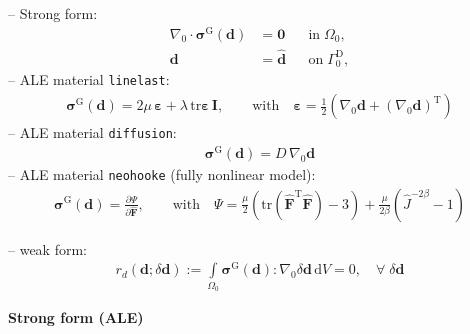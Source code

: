 \documentclass[a4paper,12pt]{report}
\newcommand{\Om}{\mathit{\Omega}}
\newcommand{\Gm}{\mathit{\Gamma}}
\begin{document}
-- Strong form:
\begin{equation}
\label{equation-ale-strong-form}
\begin{aligned}
\nabla_{0} \cdot \boldsymbol{\sigma}^{\mathrm{G}}(\boldsymbol{d}) &= \boldsymbol{0} &&\text{in} \; \mathit{\Om}_0, \\
\boldsymbol{d} &= \hat{\boldsymbol{d}} &&\text{on} \; \mathit{\Gm}_0^{\mathrm{D}},
\end{aligned}
\end{equation}
-- ALE material \verb.linelast.:
\begin{equation}
\begin{aligned}
\boldsymbol{\sigma}^{\mathrm{G}}(\boldsymbol{d}) = 2\mu \,\boldsymbol{\varepsilon} + \lambda \,\mathrm{tr}\boldsymbol{\varepsilon}\,\boldsymbol{I}, \qquad \text{with}\quad \boldsymbol{\varepsilon} = \frac{1}{2}\left(\nabla_0\boldsymbol{d} + (\nabla_0\boldsymbol{d})^{\mathrm{T}}\right)
\end{aligned}
\end{equation}
-- ALE material \verb.diffusion.:
\begin{equation}
\begin{aligned}
\boldsymbol{\sigma}^{\mathrm{G}}(\boldsymbol{d}) = D \,\nabla_0\boldsymbol{d}
\end{aligned}
\end{equation}
-- ALE material \verb.neohooke. (fully nonlinear model):
\begin{equation}
\begin{aligned}
\boldsymbol{\sigma}^{\mathrm{G}}(\boldsymbol{d}) = \frac{\partial \mathit{\Psi}}{\partial \widehat{\boldsymbol{F}}}, \qquad \text{with}\quad \mathit{\Psi} = \frac{\mu}{2}\left(\mathrm{tr}(\widehat{\boldsymbol{F}}^{\mathrm{T}}\widehat{\boldsymbol{F}}) - 3\right) + \frac{\mu}{2\beta} \left(\widehat{J}^{-2\beta} - 1\right)
\end{aligned}
\end{equation}

-- weak form:
\begin{equation}
\label{equation-ale-weak-form}
\begin{aligned}
r_{d}(\boldsymbol{d};\delta\boldsymbol{d}) := \int\limits_{\Om_0}\boldsymbol{\sigma}^{\mathrm{G}}(\boldsymbol{d}) : \nabla_{0}\delta\boldsymbol{d}\,\mathrm{d}V = 0, \quad \forall \; \delta\boldsymbol{d}
\end{aligned}
\end{equation}


\textbf{Strong form (ALE)}\\
\end{document}
